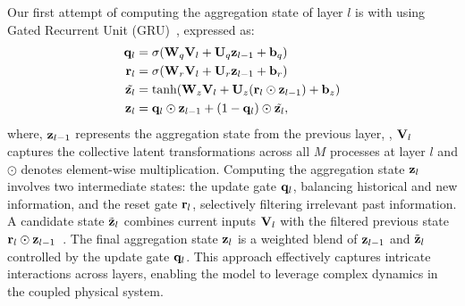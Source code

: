 Our first attempt of computing the aggregation state of layer $l$ is with using Gated Recurrent Unit (GRU)~\citep{cho2014learning}, expressed as:
\begin{align}
	{\bf q}_l &= \sigma({\bf W}_q{\bf V}_l + {\bf U}_q{\bf z}_{l-1} + {\bf b}_q) \notag\\
	{\bf r}_l &= \sigma({\bf W}_r{\bf V}_l + {\bf U}_r{\bf z}_{l-1} + {\bf b}_r) \notag\\
	\tilde{{\bf z}_{l}} &= \text{tanh}({\bf W}_z{\bf V}_l + {\bf U}_{z}({\bf r}_l \odot {\bf z}_{l-1}) + {\bf b}_z)\notag\\
	{\bf z}_l &= {\bf q}_l \odot {\bf z}_{l-1} + (1 - {\bf q}_l) \odot \tilde{{\bf z}_{l}}\notag,
\end{align}
where, ${\bf z}_{l-1}$ represents the aggregation state from the previous layer, , ${\bf V}_l$ captures the collective latent transformations across all $M$ processes at layer $l$ and $\odot$ denotes element-wise multiplication. Computing the aggregation state ${\bf z}_l$ involves two intermediate states: the update gate ${\bf q}_l$, balancing historical and new information, and the reset gate ${\bf r}_l$, selectively filtering irrelevant past information. A candidate state $\tilde{{\bf z}}_l$ combines current inputs ${\bf V}_{l}$ with the filtered previous state ${\bf r}_l \odot {\bf z}_{l-1}$~\citep{jozefowicz2015empirical, pascanu2013construct}. The final aggregation state ${\bf z}_l$ is a weighted blend of ${\bf z}_{l-1}$ and $\tilde{{\bf z}}_l$ controlled by the update gate ${\bf q}_l$. This approach effectively captures intricate interactions across layers, enabling the model to leverage complex dynamics in the coupled physical system.


